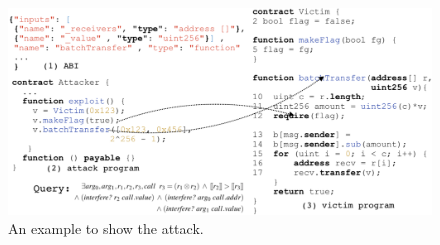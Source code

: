 \begin{figure}[!t]
  \centering
  \includegraphics[scale=0.32]{batchoverflow.pdf}
\caption{An example to show the \batchoverflow attack.}
\label{fig:batchcode}
\vspace{-0.2in}
\end{figure}

